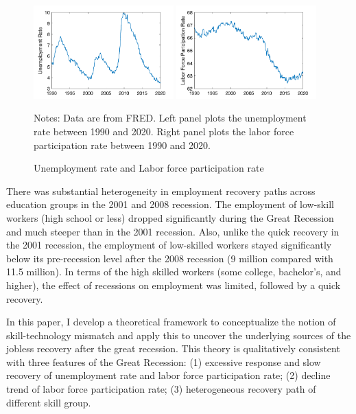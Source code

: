 \documentclass[12pt]{article}
\newcommand{\1}{\mathbb{1}}
\begin{document}
\begin{figure}[h!]
\includegraphics[width=0.48\textwidth]{UR}
\includegraphics[width=0.48\textwidth]{LFPR} 
\caption{Unemployment rate and Labor force participation rate}
\label{UR_LFPR}
{\scriptsize Notes: Data are from FRED. Left panel plots the unemployment rate between 1990 and 2020. Right panel plots the labor force participation rate between 1990 and 2020. } 
\end{figure}

There was substantial heterogeneity in employment recovery paths across education groups in the 2001 and 2008 recession. The employment of low-skill workers (high school or less) dropped significantly during the Great Recession and much steeper than in the 2001 recession. Also, unlike the quick recovery in the 2001 recession, the employment of low-skilled workers stayed significantly below its pre-recession level after the 2008 recession (9 million compared with 11.5 million).  In terms of the high skilled workers (some college, bachelor's, and higher), the effect of recessions on employment was limited, followed by a quick recovery. 

In this paper, I develop a theoretical framework to conceptualize the notion of skill-technology mismatch and apply this to uncover the underlying sources of the jobless recovery after the great recession. This theory is qualitatively consistent with three features of the Great Recession: (1) excessive response and slow recovery of unemployment rate and labor force participation rate; (2) decline trend of labor force participation rate; (3) heterogeneous recovery path of different skill group. 
\end{document}
